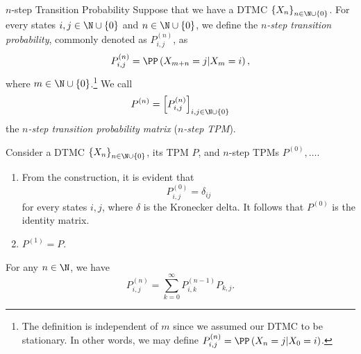 \documentclass[stat333]{subfiles}
\begin{document}
    \begin{definition}{$n$-step Transition Probability}{}
        Suppose that we have a DTMC $\left\lbrace X_n \right\rbrace^{}_{n\in\N\cup\left\lbrace 0 \right\rbrace}$. For every states $i,j\in\N\cup\left\lbrace 0 \right\rbrace$ and $n\in\N\cup\left\lbrace 0 \right\rbrace$, we define the \emph{$n$-step transition probability}, commonly denoted as $P^{\left( n \right)}_{i,j}$, as
        \begin{equation*}
            P^{\left( n \right)}_{i,j} = \PP\left( X_{m+n}=j|X_m=i \right),
        \end{equation*}
        where $m\in\N\cup\left\lbrace 0 \right\rbrace$.\footnote{The definition is independent of $m$ since we assumed our DTMC to be stationary. In other words, we may define $P^{\left( n \right)}_{i,j}=\PP\left( X_n=j|X_0=i \right)$.} We call
        \begin{equation*}
            P^{\left( n \right)} = \left[ P^{\left( n \right)}_{i,j} \right]_{i,j\in\N\cup\left\lbrace 0 \right\rbrace}
        \end{equation*}
        the \emph{$n$-step transition probability matrix} (\emph{$n$-step TPM}).
    \end{definition}

    \clearpage
    \np Consider a DTMC $\left\lbrace X_n \right\rbrace^{}_{n\in\N\cup\left\lbrace 0 \right\rbrace}$, its TPM $P$, and $n$-step TPMs $P^{\left( 0 \right)}, \ldots$.
    \begin{enumerate}
        \item From the construction, it is evident that
            \begin{equation*}
                P^{\left( 0 \right)}_{i,j}=\delta_{ij}
            \end{equation*}
            for every states $i,j$, where $\delta$ is the Kronecker delta. It follows that $P^{\left( 0 \right)}$ is the identity matrix.
        \item $P^{\left( 1 \right)}=P$.
    \end{enumerate}
    
    For any $n\in\N$, we have
    \begin{equation}
        P^{\left( n \right)}_{i,j} = \sum^{\infty}_{k=0}P^{\left( n-1 \right)}_{i,k}P_{k,j}.
    \end{equation}
\end{document}
